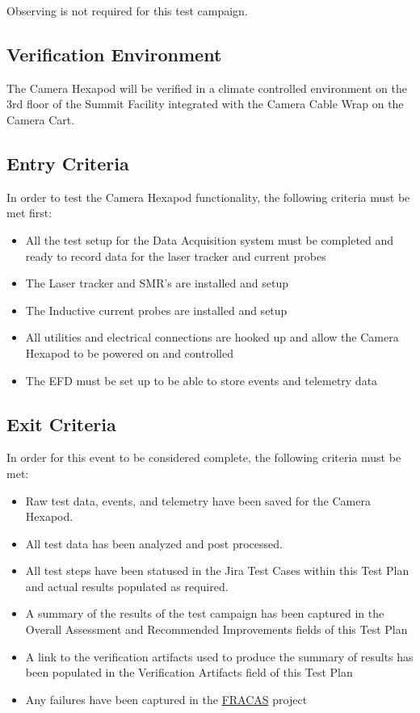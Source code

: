 \documentclass[SE,lsstdraft,STR,toc]{lsstdoc}
\providecommand{\tightlist}{
  \setlength{\itemsep}{0pt}\setlength{\parskip}{0pt}}
\begin{document}
  Observing is not required for this test campaign.

\subsection{Verification Environment}
\label{sect:hwconf}
  The Camera Hexapod will be verified in a climate controlled environment
on the 3rd floor of the Summit Facility integrated with the Camera Cable
Wrap on the Camera Cart.

  \subsection{Entry Criteria}
  In order to test the Camera Hexapod functionality, the following
criteria must be met first:

\begin{itemize}
\tightlist
\item
  All the test setup for the Data Acquisition system must be completed
  and ready to record data for the laser tracker and current probes
\item
  The Laser tracker and SMR's are installed and setup
\item
  The Inductive current probes are installed and setup
\item
  All utilities and electrical connections are hooked up and allow the
  Camera Hexapod to be powered on and controlled
\item
  The EFD must be set up to be able to store events and telemetry data
\end{itemize}

  \subsection{Exit Criteria}
  In order for this event to be considered complete, the following
criteria must be met:

\begin{itemize}
\tightlist
\item
  Raw test data, events, and telemetry have been saved for the Camera
  Hexapod.
\item
  All test data has been analyzed and post processed.
\item
  All test steps have been statused in the Jira Test Cases within this
  Test Plan and actual results populated as required.
\item
  A summary of the results of the test campaign has been captured in the
  Overall Assessment and Recommended Improvements fields of this Test
  Plan
\item
  A link to the verification artifacts used to produce the summary of
  results has been populated in the Verification Artifacts field of this
  Test Plan
\item
  Any failures have been captured in the
  \href{https://jira.lsstcorp.org/projects/FRACAS/issues/}{FRACAS}
  project
\end{itemize}
\end{document}
